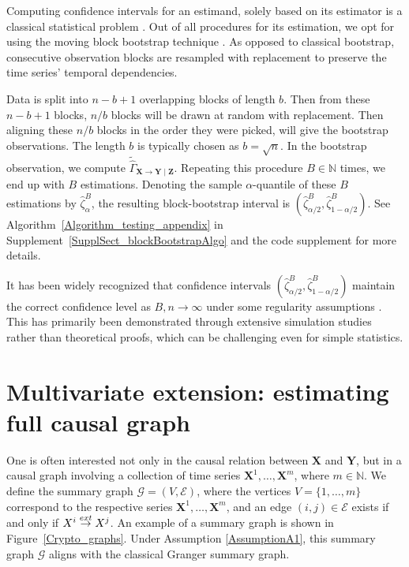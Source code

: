 \documentclass[a4paper,11pt]{article}
\newcommand{\toverset}[2]{\overset{{\rm #1}}{#2}}
\begin{document}
Computing confidence intervals for an estimand, solely based on its estimator is a classical statistical problem \citep{Vaart_1998}. Out of all procedures for its estimation, we opt for using the moving block bootstrap technique \citep{kinsch1989jackknife, Vaart_1998}. As opposed to classical bootstrap, consecutive observation blocks are resampled with replacement to preserve the time series' temporal dependencies.

Data is split into $n - b + 1$ overlapping blocks of length $b$. Then from these $n - b + 1$ blocks, $n/b$ blocks will be drawn at random with replacement. Then aligning these $n/b$ blocks in the order they were picked, will give the bootstrap observations. The length $b$ is typically chosen as $b=\sqrt{n}$.  In the bootstrap observation, we compute $\tilde{\hat{\Gamma}}_{\textbf{X}\to\textbf{Y}\mid\textbf{Z}}$. 
Repeating this procedure $B\in\mathbb{N}$ times, we end up with $B$ estimations. Denoting the sample $\alpha$-quantile of these $B$ estimations by $\hat{\zeta}_\alpha^B$, the resulting block-bootstrap interval is $(\hat{\zeta}_{\alpha/2}^B, \hat{\zeta}_{1-\alpha/2}^B)$. 
See Algorithm~\ref{Algorithm_testing_appendix} in Supplement~\ref{SupplSect_blockBootstrapAlgo} and the code supplement for more details. 

It has been widely recognized that confidence intervals  $(\hat{\zeta}_{\alpha/2}^B, \hat{\zeta}_{1-\alpha/2}^B)$ maintain the correct confidence level as $B,n\to\infty$ under some regularity assumptions \citep{davison1997bootstrap, dehaan2024bootstrapping}. This has primarily been demonstrated through extensive simulation studies rather than theoretical proofs, which can be challenging even for simple statistics. 





\section{Multivariate extension: estimating full causal graph}
\label{Section5}
\label{section_algorithm2_estimating_full_causal_graph}
One is often interested not only in the causal relation between $\textbf{X}$ and $\textbf{Y}$, but in a causal graph involving a collection of time series $\textbf{X}^1, \dots, \textbf{X}^m$, where $m\in\mathbb{N}$. 
We define the summary graph $\mathcal{G}=(V, \mathcal{E})$, where the vertices $V=\{1, \dots, m\}$ correspond to the respective series $\textbf{X}^1, \dots, \textbf{X}^m$, and an edge $(i, j)\in \mathcal{E}$ exists if and only if $\textbf{X}^i \toverset{ext}{\to} \textbf{X}^j$. 
An example of a summary graph is shown in Figure~\ref{Crypto_graphs}. Under Assumption \ref{AssumptionA1}, this summary graph $\mathcal{G}$ aligns with the classical Granger summary graph.
\end{document}
